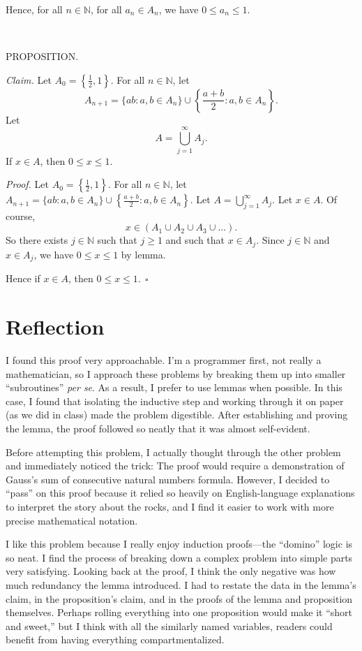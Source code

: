 \documentclass[9pt]{article}
\begin{document}
\noindent Hence, for all $n\in\mathbb{N}$, for all $a_n\in A_n$, we have $0\leq a_n\leq 1$.\newline

~\newline

\noindent\small{PROPOSITION.}\newline

\noindent\textit{Claim. }Let $A_0=\left\{\frac{1}{2},1
\right\}$. For all $n\in\mathbb{N}$, let
\[A_{n+1}=\{ab:a,b\in A_n\}\cup\left\{\frac{a+b}{2}:a,b\in A_n\right\}.\]
Let
\[A=\bigcup_{j=1}^{\infty}{A_j}.\]
If $x\in A$, then $0\leq x\leq 1$.\newline

\noindent\textit{Proof. }Let $A_0=\left\{\frac{1}{2},1
\right\}$. For all $n\in\mathbb{N}$, let $A_{n+1}=\{ab:a,b\in A_n\}\cup\left\{\frac{a+b}{2}:a,b\in A_n\right\}$. Let $A=\bigcup_{j=1}^{\infty}{A_j}$. Let $x\in A$. Of course,
\[x\in(A_1\cup A_2\cup A_3\cup\dots).\]
So there exists $j\in\mathbb{N}$ such that $j\geq 1$ and such that $x\in A_j$. Since $j\in\mathbb{N}$ and $x\in A_j$, we have $0\leq x\leq 1$ by lemma.\newline

\noindent Hence if $x\in A$, then $0\leq x\leq 1.~~\square$
\section*{Reflection}
I found this proof very approachable. I'm a programmer first, not really a mathematician, so I approach these problems by breaking them up into smaller ``subroutines'' \textit{per se}. As a result, I prefer to use lemmas when possible. In this case, I found that isolating the inductive step and working through it on paper (as we did in class) made the problem digestible. After establishing and proving the lemma, the proof followed so neatly that it was almost self-evident. 

Before attempting this problem, I actually thought through the other problem and immediately noticed the trick: The proof would require a demonstration of Gauss's sum of consecutive natural numbers formula. However, I decided to ``pass'' on this proof because it relied so heavily on English-language explanations to interpret the story about the rocks, and I find it easier to work with more precise mathematical notation. 

I like this problem because I really enjoy induction proofs---the ``domino'' logic is so neat. I find the process of breaking down a complex problem into simple parts very satisfying. Looking back at the proof, I think the only negative was how much redundancy the lemma introduced. I had to restate the data in the lemma's claim, in the proposition's claim, and in the proofs of the lemma and proposition themselves. Perhaps rolling everything into one proposition would make it ``short and sweet,'' but I think with all the similarly named variables, readers could benefit from having everything compartmentalized.
\end{document}
